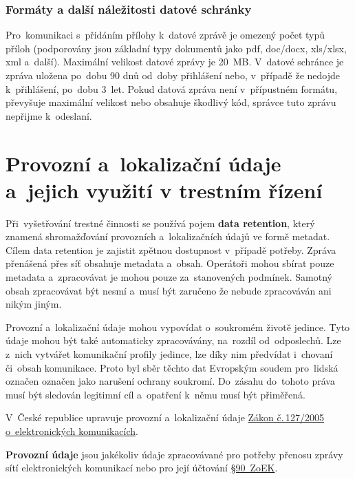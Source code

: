 \subsubsection{Formáty a další náležitosti datové schránky}

Pro~komunikaci s~přidáním přílohy k~datové zprávě je omezený počet typů příloh (podporovány jsou základní typy dokumentů jako pdf, doc/docx, xls/xlsx, xml a~další). Maximální velikost datové zprávy je 20~MB. V~datové schránce je zpráva uložena po~dobu 90 dnů od~doby přihlášení nebo, v~případě že nedojde k~přihlášení, po~dobu 3~let. Pokud datová zpráva není v~přípustném formátu, převyšuje maximální velikost nebo obsahuje škodlivý kód, správce tuto zprávu nepřijme k~odeslaní.













\clearpage
\section{Provozní a~lokalizační údaje a~jejich využití v trestním řízení}

Při~vyšetřování trestné činnosti se používá pojem \textbf{data retention}, který znamená shromažďování provozních a~lokalizačních údajů ve formě metadat. Cílem data retention je zajistit zpětnou dostupnost v~případě potřeby. Zpráva přenášená přes síť obsahuje metadata a~obsah. Operátoři mohou sbírat pouze metadata a~zpracovávat je mohou pouze za~stanovených podmínek. Samotný obsah zpracovávat být nesmí a~musí být zaručeno že nebude zpracováván ani nikým jiným.

Provozní a~lokalizační údaje mohou vypovídat o~soukromém životě jedince. Tyto údaje mohou být také automaticky zpracovávány, na~rozdíl od~odposlechů. Lze z~nich vytvářet komunikační profily jedince, lze díky nim předvídat i~chovaní či~obsah komunikace. Proto byl sběr těchto dat Evropským soudem pro~lidská označen označen jako narušení ochrany soukromí. Do~zásahu do~tohoto práva musí být sledován legitimní cíl a~opatření k~němu musí být přiměřená.

V~České republice upravuje provozní a~lokalizační údaje \href{https://www.zakonyprolidi.cz/cs/2005-127}{Zákon č.\,127/2005 o~elektronických komunikacích}.

\textbf{Provozní údaje} jsou jakékoliv údaje zpracovávané pro potřeby přenosu zprávy sítí elektronických komunikací nebo pro její účtování \href{https://www.zakonyprolidi.cz/cs/2005-127#p90-1}{§90~ZoEK}. 

